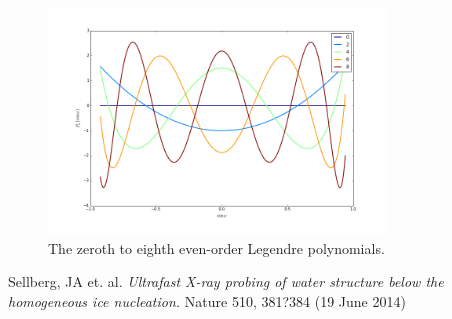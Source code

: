 \documentclass[12pt]{article}
\begin{document}
\begin{figure}[h]
\center
\includegraphics[width=0.8\textwidth]{figures/LPs_8.png}
\caption{The zeroth to eighth even-order Legendre polynomials. }
\label{fig:LPs}
\end{figure}


\begin{thebibliography}{9}
Sellberg, JA et. al.
\textit{Ultrafast X-ray probing of water structure below the homogeneous ice nucleation.}
Nature 510, 381?384 (19 June 2014)
\end{thebibliography}
\end{document}
